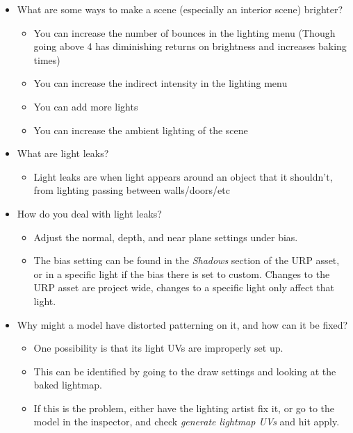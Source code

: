 \documentclass{article}
\begin{document}
\begin{itemize}
\begin{itemize}
    \end{itemize}
    \item What are some ways to make a scene (especially an interior scene) brighter?
    \begin{itemize}
        \item You can increase the number of bounces in the lighting menu (Though going above 4 has diminishing returns on brightness and increases baking times)
        \item You can increase the indirect intensity in the lighting menu
        \item You can add more lights
        \item You can increase the ambient lighting of the scene
    \end{itemize}
    \item What are light leaks?
    \begin{itemize}
        \item Light leaks are when light appears around an object that it shouldn't, from lighting passing between walls/doors/etc
    \end{itemize}
    \item How do you deal with light leaks?
    \begin{itemize}
        \item Adjust the normal, depth, and near plane settings under bias.
        \item The bias setting can be found in the \textit{Shadows} section of the URP asset, or in a specific light if the bias there is set to custom. Changes to the URP asset are project wide, changes to a specific light only affect that light.
    \end{itemize}
    \item Why might a model have distorted patterning on it, and how can it be fixed?
    \begin{itemize}
        \item One possibility is that its light UVs are improperly set up.
        \item This can be identified by going to the draw settings and looking at the baked lightmap. 
        \item If this is the problem, either have the lighting artist fix it, or go to the model in the inspector, and check \textit{generate lightmap UVs} and hit apply.
    \end{itemize}
\end{itemize}
\end{document}
